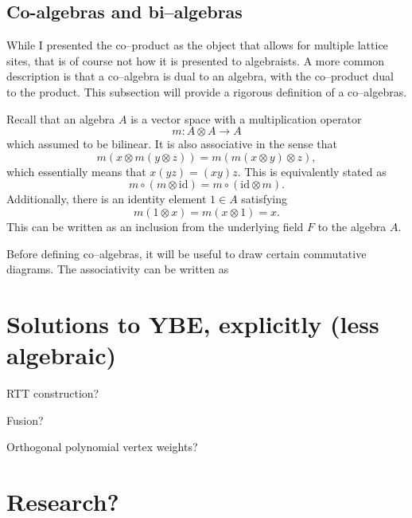 \documentclass{ximera}
\begin{document}
\subsection{Co-algebras and bi--algebras}
While I presented the co--product as the object that allows for multiple lattice sites, that is of 
course not how it is presented to algebraists. A more common description is that a co--algebra is
dual to an algebra, with the co--product dual to the product. This subsection will provide a rigorous
definition of a co--algebras.

Recall that an algebra \(A\) is a vector space with a multiplication operator
\[
m: A \otimes A \rightarrow A   
\]
which assumed to be bilinear. It is also associative in the sense that
\[
m(x \otimes m(y \otimes z)) = m(m(x \otimes y) \otimes z),   
\]
which essentially means that \( x(yz) = (xy)z.\) This is equivalently stated as
\[
m \circ (m \otimes \mathrm{id})   = m \circ (\mathrm{id} \otimes m).
\]
Additionally, there is an identity element \(1 \in A\) satisfying
\[
m(1 \otimes x) = m(x \otimes 1) = x.   
\]
This can be written as an inclusion from the underlying field \(F\) to the algebra \(A.\)

Before defining co--algebras, it will be useful to draw certain commutative diagrams. The associativity
can be written as





\section{Solutions to YBE, explicitly (less algebraic)}

RTT construction?

Fusion?

Orthogonal polynomial vertex weights?

\section{Research?}
\end{document}
